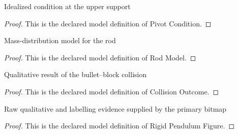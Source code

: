 \begin{definition}
  \label{def:physics:phyx-mini-0713:phyxminiproblems-problemphyxmini0713-pivotcondition}
  Idealized condition at the upper support
\end{definition}
\begin{proof}
  This is the declared model definition of Pivot Condition.
\end{proof}
\begin{definition}
  \label{def:physics:phyx-mini-0713:phyxminiproblems-problemphyxmini0713-rodmodel}
  Mass-distribution model for the rod
\end{definition}
\begin{proof}
  This is the declared model definition of Rod Model.
\end{proof}
\begin{definition}
  \label{def:physics:phyx-mini-0713:phyxminiproblems-problemphyxmini0713-collisionoutcome}
  Qualitative result of the bullet--block collision
\end{definition}
\begin{proof}
  This is the declared model definition of Collision Outcome.
\end{proof}
\begin{definition}
  \label{def:physics:phyx-mini-0713:phyxminiproblems-problemphyxmini0713-rigidpendulumfigure}
  Raw qualitative and labelling evidence supplied by the primary bitmap
\end{definition}
\begin{proof}
  This is the declared model definition of Rigid Pendulum Figure.
\end{proof}
